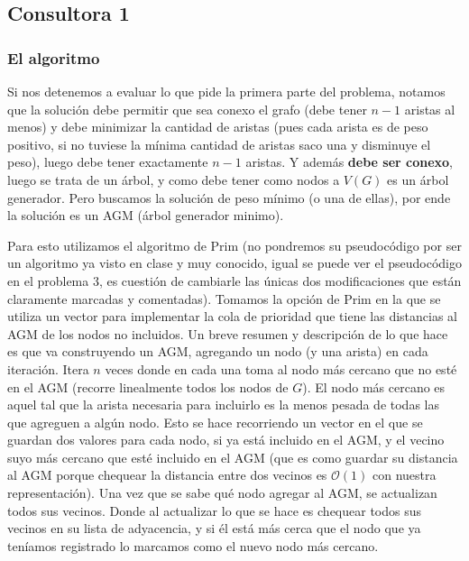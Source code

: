 \documentclass[A4paper,oneside,fleqn,11pt]{article}
\theoremstyle{definition}
\begin{document}
\subsection{Consultora 1}

\subsubsection{El algoritmo}
Si nos detenemos a evaluar lo que pide la primera parte del problema, notamos que la solución debe permitir que sea conexo el grafo (debe tener $n-1$ aristas al menos) y debe minimizar la cantidad de aristas (pues cada arista es de peso positivo, si no tuviese la mínima cantidad de aristas saco una y disminuye el peso), luego debe tener exactamente $n-1$ aristas. Y además \textbf{debe ser conexo}, luego se trata de un árbol, y como debe tener como nodos a $V(G)$ es un árbol generador. Pero buscamos la solución de peso mínimo (o una de ellas), por ende la solución es un AGM (árbol generador minimo). 

Para esto utilizamos el algoritmo de Prim (no pondremos su pseudocódigo por ser un algoritmo ya visto en clase y muy conocido, igual se puede ver el pseudocódigo en el problema 3, es cuestión de cambiarle las únicas dos modificaciones que están claramente marcadas y comentadas). Tomamos la opción de Prim en la que se utiliza un vector para implementar la cola de prioridad que tiene las distancias al AGM de los nodos no incluidos. Un breve resumen y descripción de lo que hace es que va construyendo un AGM, agregando un nodo (y una arista) en cada iteración. Itera $n$ veces donde en cada una toma al nodo más cercano que no esté en el AGM (recorre linealmente todos los nodos de $G$). El nodo más cercano es aquel tal que la arista necesaria para incluirlo es la menos pesada de todas las que agreguen a algún nodo. Esto se hace recorriendo un vector en el que se guardan dos valores para cada nodo, si ya está incluido en el AGM, y el vecino suyo más cercano que esté incluido en el AGM (que es como guardar su distancia al AGM porque chequear la distancia entre dos vecinos es $\mathcal{O} (1)$ con nuestra representación). Una vez que se sabe qué nodo agregar al AGM, se actualizan todos sus vecinos. Donde al actualizar lo que se hace es chequear todos sus vecinos en su lista de adyacencia, y si él está más cerca que el nodo que ya teníamos registrado lo marcamos como el nuevo nodo más cercano.
\end{document}
